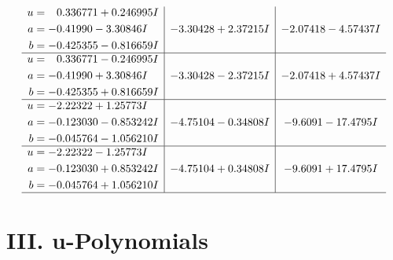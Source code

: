\documentclass[1p]{elsarticle_modified}
\theoremstyle{definition}
\begin{document}
$$\begin{array}{c|c|c}
\begin{aligned}
u &= \phantom{-}0.336771 + 0.246995 I \\
a &= -0.41990 - 3.30846 I \\
b &= -0.425355 - 0.816659 I\end{aligned}
 & -3.30428 + 2.37215 I & -2.07418 - 4.57437 I \\ \hline\begin{aligned}
u &= \phantom{-}0.336771 - 0.246995 I \\
a &= -0.41990 + 3.30846 I \\
b &= -0.425355 + 0.816659 I\end{aligned}
 & -3.30428 - 2.37215 I & -2.07418 + 4.57437 I \\ \hline\begin{aligned}
u &= -2.22322 + 1.25773 I \\
a &= -0.123030 - 0.853242 I \\
b &= -0.045764 - 1.056210 I\end{aligned}
 & -4.75104 - 0.34808 I & -9.6091 - 17.4795 I \\ \hline\begin{aligned}
u &= -2.22322 - 1.25773 I \\
a &= -0.123030 + 0.853242 I \\
b &= -0.045764 + 1.056210 I\end{aligned}
 & -4.75104 + 0.34808 I & -9.6091 + 17.4795 I\\
 \hline 
 \end{array}$$\newpage
\newpage\renewcommand{\arraystretch}{1}
\centering \section*{ III. u-Polynomials}
\end{document}
